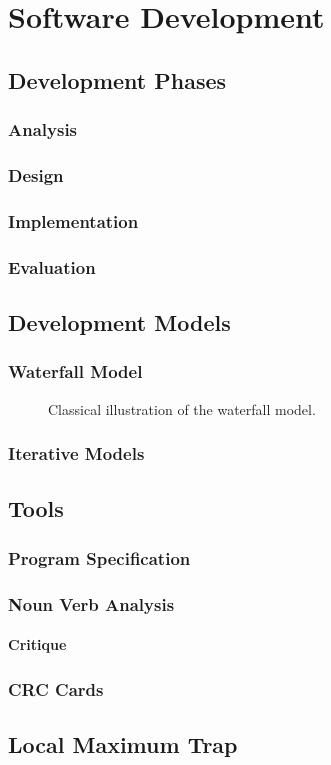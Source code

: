 \chapter{Software Development}

\section{Development Phases}
\subsection{Analysis}
\subsection{Design}
\subsection{Implementation}
\subsection{Evaluation}

\section{Development Models}
\subsection{Waterfall Model}

\begin{figure}[tbp]
  
  \caption{Classical illustration of the waterfall model.}
  \label{fig:swdev:waterfall}
\end{figure}

\subsection{Iterative Models}

\section{Tools}
\subsection{Program Specification}
\subsection{Noun Verb Analysis}
\subsubsection{Critique}
\subsection{CRC Cards}

\section{Local Maximum Trap}



